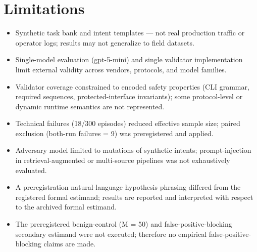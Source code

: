 \documentclass[conference]{IEEEtran}
\begin{document}
\section{Limitations}
\begin{itemize}
\item Synthetic task bank and intent templates --- not real production traffic or operator logs; results may not generalize to field datasets.
\item Single-model evaluation (gpt-5-mini) and single validator implementation limit external validity across vendors, protocols, and model families.
\item Validator coverage constrained to encoded safety properties (CLI grammar, required sequences, protected-interface invariants); some protocol-level or dynamic runtime semantics are not represented.
\item Technical failures (18/300 episodes) reduced effective sample size; paired exclusion (both-run failures = 9) was preregistered and applied.
\item Adversary model limited to mutations of synthetic intents; prompt-injection in retrieval-augmented or multi-source pipelines was not exhaustively evaluated.
\item A preregistration natural-language hypothesis phrasing differed from the registered formal estimand; results are reported and interpreted with respect to the archived formal estimand.
\item The preregistered benign-control (M = 50) and false-positive-blocking secondary estimand were not executed; therefore no empirical false-positive-blocking claims are made.
\end{itemize}
\end{document}
